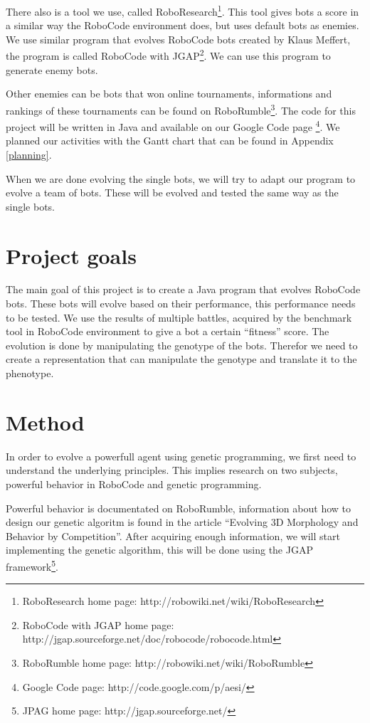 \documentclass[a4paper,10pt]{article}
\begin{document}
There also is a tool we use, called RoboResearch\footnote{RoboResearch home page: http://robowiki.net/wiki/RoboResearch}. This tool gives bots a score in a similar way the RoboCode environment does, but uses default bots as enemies.
We use similar program that evolves RoboCode bots created by Klaus Meffert, the program is called RoboCode with JGAP\footnote{RoboCode with JGAP home page: http://jgap.sourceforge.net/doc/robocode/robocode.html}. We can use this program to generate enemy bots.

Other enemies can be bots that won online tournaments, informations and rankings of these tournaments can be found on RoboRumble\footnote{RoboRumble home page: http://robowiki.net/wiki/RoboRumble}.
The code for this project will be written in Java and available on our Google Code page \footnote{Google Code page: http://code.google.com/p/aesi/}.
We planned our activities with the Gantt chart that can be found in Appendix \ref{planning}.

When we are done evolving the single bots, we will try to adapt our program to evolve a team of bots. These will be evolved and tested the same way as the single bots.

\section{Project goals}
The main goal of this project is to create a Java program that evolves RoboCode bots.
These bots will evolve based on their performance, this performance needs to be tested. We use the results of multiple battles, acquired by the benchmark tool in RoboCode environment to give a bot a certain ``fitness'' score.
The evolution is done by manipulating the genotype of the bots. Therefor we need to create a representation that can manipulate the genotype and translate it to the phenotype.

\section{Method}
In order to evolve a powerfull agent using genetic programming, we first need to understand the underlying principles. This implies research on two subjects, powerful behavior in RoboCode and genetic programming.

Powerful behavior is documentated on RoboRumble, information about how to design our genetic algoritm is found in the article ``Evolving 3D Morphology and Behavior by Competition''\cite{karlsims}.
After acquiring enough information, we will start implementing the genetic algorithm, this will be done using the JGAP framework\footnote{JPAG home page: http://jgap.sourceforge.net/}.
\end{document}
